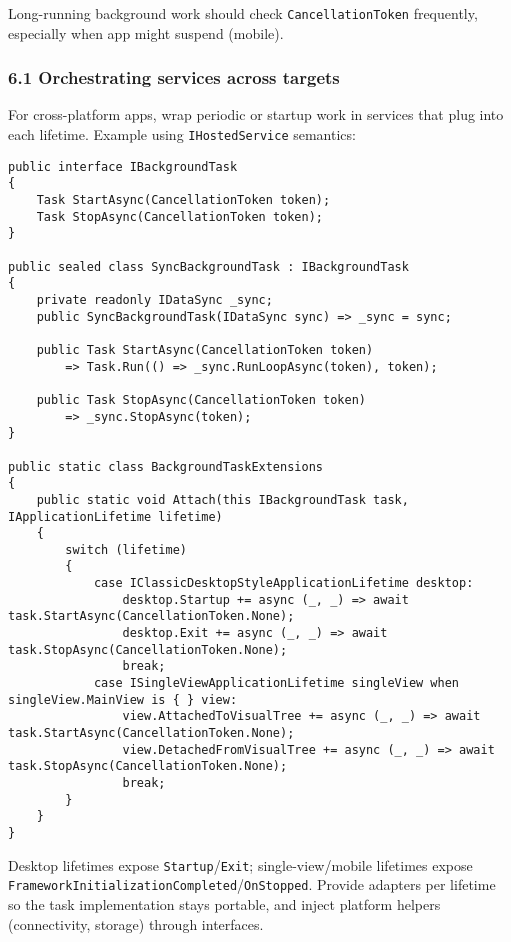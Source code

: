 Long-running background work should check
\passthrough{\lstinline!CancellationToken!} frequently, especially when
app might suspend (mobile).

\subsubsection{6.1 Orchestrating services across
targets}\label{orchestrating-services-across-targets}

For cross-platform apps, wrap periodic or startup work in services that
plug into each lifetime. Example using
\passthrough{\lstinline!IHostedService!} semantics:

\begin{lstlisting}
public interface IBackgroundTask
{
    Task StartAsync(CancellationToken token);
    Task StopAsync(CancellationToken token);
}

public sealed class SyncBackgroundTask : IBackgroundTask
{
    private readonly IDataSync _sync;
    public SyncBackgroundTask(IDataSync sync) => _sync = sync;

    public Task StartAsync(CancellationToken token)
        => Task.Run(() => _sync.RunLoopAsync(token), token);

    public Task StopAsync(CancellationToken token)
        => _sync.StopAsync(token);
}

public static class BackgroundTaskExtensions
{
    public static void Attach(this IBackgroundTask task, IApplicationLifetime lifetime)
    {
        switch (lifetime)
        {
            case IClassicDesktopStyleApplicationLifetime desktop:
                desktop.Startup += async (_, _) => await task.StartAsync(CancellationToken.None);
                desktop.Exit += async (_, _) => await task.StopAsync(CancellationToken.None);
                break;
            case ISingleViewApplicationLifetime singleView when singleView.MainView is { } view:
                view.AttachedToVisualTree += async (_, _) => await task.StartAsync(CancellationToken.None);
                view.DetachedFromVisualTree += async (_, _) => await task.StopAsync(CancellationToken.None);
                break;
        }
    }
}
\end{lstlisting}

Desktop lifetimes expose
\passthrough{\lstinline!Startup!}/\passthrough{\lstinline!Exit!};
single-view/mobile lifetimes expose
\passthrough{\lstinline!FrameworkInitializationCompleted!}/\passthrough{\lstinline!OnStopped!}.
Provide adapters per lifetime so the task implementation stays portable,
and inject platform helpers (connectivity, storage) through interfaces.

